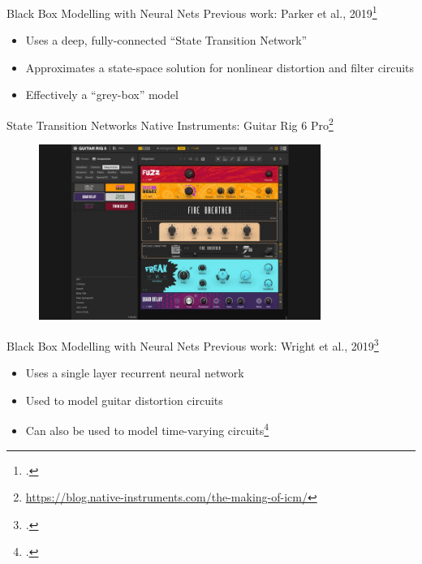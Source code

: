
\begin{frame}{Black Box Modelling with Neural Nets}
    Previous work: Parker et al., 2019\footcite[]{NLML}
    \vspace{1ex}
    \begin{itemize}
        \itemsep0.5em
        \item Uses a deep, fully-connected ``State Transition Network''
        \item Approximates a state-space solution for nonlinear distortion and filter circuits
        \item Effectively a ``grey-box'' model
    \end{itemize}
\end{frame}

\begin{frame}{State Transition Networks}
    Native Instruments: Guitar Rig 6 Pro\footnote{\url{https://blog.native-instruments.com/the-making-of-icm/}}
    \begin{figure}
        \centering
        \includegraphics[height=2.25in]{Figures/GuitarRig6.jpg}
    \end{figure}
\end{frame}

\begin{frame}{Black Box Modelling with Neural Nets}
    Previous work: Wright et al., 2019\footcite[]{VArnn}
    \vspace{1ex}
    \begin{itemize}
        \itemsep0.5em
        \item Uses a single layer recurrent neural network
        \item Used to model guitar distortion circuits
        \item Can also be used to model time-varying circuits\footcite[]{RNNtime}
    \end{itemize}
\end{frame}
